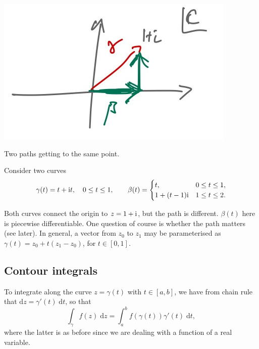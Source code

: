 \documentclass[letter-paper]{tufte-book}
\newenvironment{example}[1][Example]{\begin{trivlist}
\item[\hskip \labelsep {\bfseries #1}]}{\end{trivlist}}
\newcommand{\zi}{{\rm i}}
\begin{document}
\begin{example}
  \begin{marginfigure}
    \includegraphics{comp_split_curve}
    \caption{Two paths getting to the same point.}
  \end{marginfigure}
  Consider two curves
  \begin{equation*}
    \gamma(t) = t + \zi t, \quad 0 \leq t \leq 1, \qquad \beta(t) = \begin{cases}t, & 0 \leq t \leq 1, \\ 1 + (t-1)\zi & 1 \leq t \leq 2. \end{cases}
  \end{equation*}
  
  Both curves connect the origin to $z = 1 + \zi$, but the path is different.
  $\beta(t)$ here is piecewise differentiable. One question of course is whether
  the path matters (see later). In general, a vector from $z_0$ to $z_1$ may be
  parameterised as $\gamma(t) = z_0 + t (z_1 - z_0)$, for $t \in [0, 1]$.
\end{example}


\subsection{Contour integrals}

To integrate along the curve $z = \gamma(t)$ with $t\in[a, b]$, we have from
chain rule that $\mathrm{d}z = \gamma'(t)\; \mathrm{d}t$, so that
\begin{equation*}
  \int_{\gamma} f(z)\; \mathrm{d}z = \int^b_a f(\gamma(t)) \gamma'(t)\; \mathrm{d}t,
\end{equation*}
where the latter is as before since we are dealing with a function of a real
variable.
\end{document}
